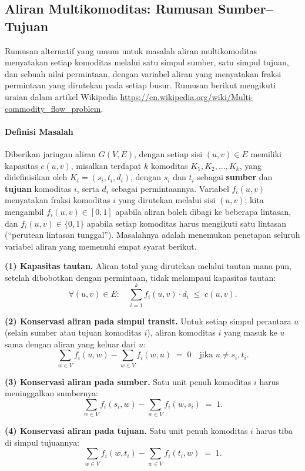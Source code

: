 \subsection{Aliran Multikomoditas: Rumusan Sumber--Tujuan}
\label{sec:multicommodity-source-sink}

Rumusan alternatif yang umum untuk masalah aliran multikomoditas menyatakan setiap komoditas melalui satu simpul sumber, satu simpul tujuan, dan sebuah nilai permintaan, dengan variabel aliran yang menyatakan fraksi permintaan yang dirutekan pada setiap busur. Rumusan berikut mengikuti uraian dalam artikel Wikipedia \url{https://en.wikipedia.org/wiki/Multi-commodity_flow_problem}.

\paragraph{Definisi Masalah}
Diberikan jaringan aliran \(G(V,E)\), dengan setiap sisi \((u,v) \in E\) memiliki kapasitas \(c(u,v)\), misalkan terdapat \(k\) komoditas
\(K_1,K_2,\dots,K_k\), yang didefinisikan oleh \(K_i=(s_i,t_i,d_i)\), dengan \(s_i\) dan \(t_i\) sebagai \textbf{sumber} dan \textbf{tujuan} komoditas \(i\), serta \(d_i\) sebagai permintaannya. Variabel \(f_i(u,v)\) menyatakan fraksi komoditas \(i\) yang dirutekan melalui sisi \((u,v)\); kita mengambil \(f_i(u,v) \in [0,1]\) apabila aliran boleh dibagi ke beberapa lintasan, dan \(f_i(u,v) \in \{0,1\}\) apabila setiap komoditas harus mengikuti satu lintasan (``perutean lintasan tunggal''). Masalahnya adalah menemukan penetapan seluruh variabel aliran yang memenuhi empat syarat berikut.

\textbf{(1) Kapasitas tautan.} Aliran total yang dirutekan melalui tautan mana pun, setelah dibobotkan dengan permintaan, tidak melampaui kapasitas tautan:
\[
\forall (u,v)\in E:\quad \sum_{i=1}^{k} f_i(u,v)\cdot d_i \;\leq\; c(u,v).
\]

\textbf{(2) Konservasi aliran pada simpul transit.} Untuk setiap simpul perantara \(u\) (selain sumber atau tujuan komoditas \(i\)), aliran komoditas \(i\) yang masuk ke \(u\) sama dengan aliran yang keluar dari \(u\):
\[
\sum_{w \in V} f_i(u,w) - \sum_{w \in V} f_i(w,u) \;=\; 0 \quad \text{jika } u \neq s_i, t_i.
\]

\textbf{(3) Konservasi aliran pada sumber.} Satu unit penuh komoditas \(i\) harus meninggalkan sumbernya:
\[
\sum_{w \in V} f_i(s_i,w) - \sum_{w \in V} f_i(w,s_i) \;=\; 1.
\]

\textbf{(4) Konservasi aliran pada tujuan.} Satu unit penuh komoditas \(i\) harus tiba di simpul tujuannya:
\[
\sum_{w \in V} f_i(w,t_i) - \sum_{w \in V} f_i(t_i,w) \;=\; 1.
\]

